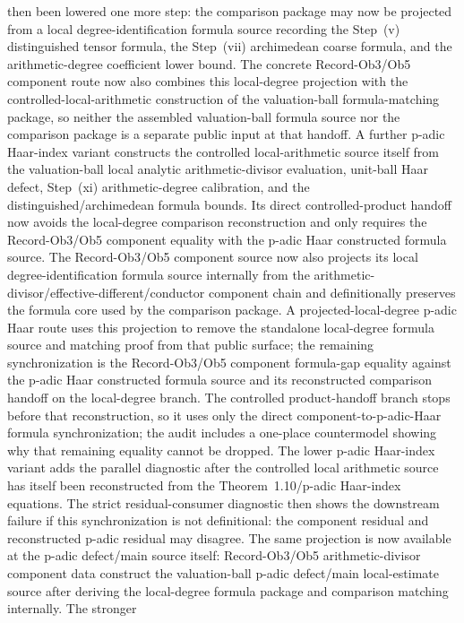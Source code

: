 \documentclass[11pt]{article}
\theoremstyle{plain}
\theoremstyle{definition}
\theoremstyle{remark}
\begin{document}
then been lowered one more step: the comparison package may now be projected
from a local degree-identification formula source recording the Step~(v)
distinguished tensor formula, the Step~(vii) archimedean coarse formula, and
the arithmetic-degree coefficient lower bound.  The concrete Record-Ob3/Ob5
component route now also combines this local-degree projection with the
controlled-local-arithmetic construction of the valuation-ball formula-matching
package, so neither the assembled valuation-ball formula source nor the
comparison package is a separate public input at that handoff.  A further
p-adic Haar-index variant constructs the controlled local-arithmetic source
itself from the valuation-ball local analytic arithmetic-divisor evaluation,
unit-ball Haar defect, Step~(xi) arithmetic-degree calibration, and the
distinguished/archimedean formula bounds.  Its direct controlled-product
handoff now avoids the local-degree comparison reconstruction and only requires
the Record-Ob3/Ob5 component equality with the p-adic Haar constructed formula
source.  The Record-Ob3/Ob5 component source now also projects its local
degree-identification formula source internally
from the arithmetic-divisor/effective-different/conductor component chain and
definitionally preserves the formula core used by the comparison package.  A
projected-local-degree p-adic Haar route uses this projection to remove the
standalone local-degree formula source and matching proof from that public
surface; the remaining synchronization is the Record-Ob3/Ob5 component
formula-gap equality against the p-adic Haar constructed formula source and its
reconstructed comparison handoff on the local-degree branch.  The controlled
product-handoff branch stops before that reconstruction, so it uses only the
direct component-to-p-adic-Haar formula synchronization; the audit includes a
one-place countermodel showing why that remaining equality cannot be dropped.
The lower p-adic Haar-index variant adds the parallel diagnostic after the
controlled local arithmetic source has itself been reconstructed from the
Theorem~1.10/p-adic Haar-index equations.  The strict residual-consumer
diagnostic then shows the downstream failure if this synchronization is not
definitional: the component residual and reconstructed p-adic residual may
disagree.
The same projection is now available at the p-adic defect/main source itself:
Record-Ob3/Ob5 arithmetic-divisor component data construct the valuation-ball
p-adic defect/main local-estimate source after deriving the local-degree
formula package and comparison matching internally.  The stronger
\end{document}

